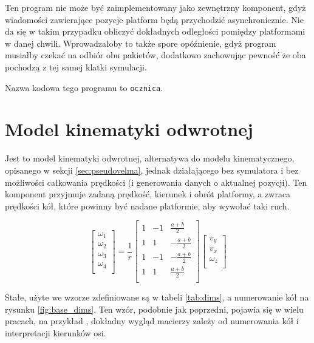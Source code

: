 	Ten program nie może być zaimplementowany jako zewnętrzny komponent, gdyż wiadomości zawierające pozycje platform będą przychodzić asynchronicznie.
	Nie da się w takim przypadku obliczyć dokładnych odległości pomiędzy platformami w danej chwili. 
	Wprowadzałoby to także spore opóźnienie, gdyż program musiałby czekać na odbiór obu pakietów, dodatkowo zachowując pewność że oba pochodzą z tej samej klatki symulacji.
	
	Nazwa kodowa tego programu to \texttt{ocznica}.
	
\section{Model kinematyki odwrotnej}
	\label{sec:transmutator}
	Jest to model kinematyki odwrotnej, alternatywa do modelu kinematycznego, opisanego w sekcji \ref{sec:pseudovelma}, jednak działającego bez symulatora i bez możliwości 
	całkowania prędkości (i generowania danych o aktualnej pozycji).
	Ten komponent przyjmuje zadaną prędkość, kierunek i obrót platformy, a zwraca prędkości kół, które powinny być nadane platformie, aby wywołać taki ruch.
	
	\begin{equation}
	\begin{bmatrix}
	\omega_1 \\
	\omega_2 \\
	\omega_3 \\
	\omega_4 \\
	\end{bmatrix}
	=
	\frac{1}{r}
	\begin{bmatrix}
	1 & -1 & \frac{a+b}{2} \\
	1 & 1 & -\frac{a+b}{2} \\
	1 & -1 & -\frac{a+b}{2} \\
	1 & 1 & \frac{a+b}{2} \\
	\end{bmatrix}
	\begin{bmatrix}
	v_y \\
	v_x \\
	\omega_z \\
	\end{bmatrix}
	\end{equation}
	
	Stałe, użyte we wzorze zdefiniowane są w tabeli \ref{tab:dims}, a numerowanie kół na rysunku \ref{fig:base_dims}.
	Ten wzór, podobnie jak poprzedni, pojawia się w wielu pracach, na przykład \cite{wheels}, dokładny wygląd macierzy zależy od numerowania kół i interpretacji kierunków osi.
	
